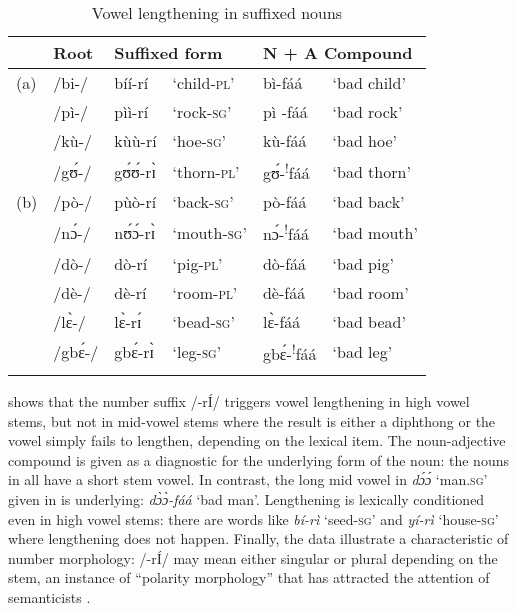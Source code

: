 \documentclass[output=paper,newtxmath,modfonts,nonflat,draftmode]{langsci/langscibook}
\begin{document}
\begin{table}
\begin{tabularx}{\textwidth}{lXlXlX}
\lsptoprule
& {Root} & \multicolumn{2}{l}{{Suffixed form}} & \multicolumn{2}{l}{{N + A Compound}} \\
\midrule
(a) & /bi-/ & bíí-rí & ‘child-\textsc{pl’} & bì-fáá & ‘bad child’\\
& /pì-/ & pìì-rí & ‘rock-\textsc{sg’} & pì -fáá & ‘bad rock’\\
& /kù-/ & kùù-rí & ‘hoe-\textsc{sg}’ & kù-fáá & ‘bad hoe’\\
& /gʊ́-/ & gʊ́ʊ́-rɪ̀ & ‘thorn-\textsc{pl’} & gʊ́-\textsuperscript{!}fáá & ‘bad thorn’\\
\tablevspace
(b) & /pò-/ & pùò-rí & ‘back-\textsc{sg}’ & pò-fáá & ‘bad back’\\
& /nɔ́-/ & nʊ́ɔ́-rɪ̀ & ‘mouth-\textsc{sg}’ & nɔ́-\textsuperscript{!}fáá & ‘bad mouth’\\
& /dò-/ & dò-rí & ‘pig-\textsc{pl}’ & dò-fáá & ‘bad pig’\\
& /dè-/ & dè-rí & ‘room-\textsc{pl}’ & dè-fáá & ‘bad room’\\
& /lɛ̀-/ & lɛ̀-rɪ́ & ‘bead-\textsc{sg}’ & lɛ̀-fáá & ‘bad bead’\\
& /gbɛ́-/ & gbɛ́-rɪ̀ & ‘leg-\textsc{sg}’ & gbɛ́-\textsuperscript{!}fáá & ‘bad leg’\\
\lspbottomrule
\end{tabularx}
\caption{Vowel lengthening in suffixed nouns}
\label{tab:anttila:3} 
\end{table}


\break
{ shows that the number suffix /-rÍ/ triggers vowel}{ lengthening} {i}{n high vowel stems}{, but not in mid-vowel stems where the result is either a diphthong or the vowel simply fails to lengthen, depending on the lexical item. The noun-adjective compound is given as a diagnostic for the underlying form of the noun: the nouns in  all have a short stem vowel. In contrast, the} {long mid vowel} {in} {\textit{dɔ́ɔ́}}{ ‘man.}{\textsc{sg}}{’ given in  is underlying:} {\textit{dɔ̀ɔ̀-}}{\textit{fáá}}{ ‘bad man’.} {Lengthening is lexically conditioned even in high vowel stems: there are words like} {\textit{bí-rì}}{ ‘seed-}{\textsc{sg’}}{ and} {\textit{yí-rì}}{ ‘house-}{\textsc{sg}}{’ where lengthening does not happen. Finally,} {the data illustrate a characteristic}{  of  number morphology: /-r}{Í}{/ may mean either singular or plural depending on the stem, an instance of “polarity morphology” that has attracted the attention of semanticists \citep{Grimm2012}.} 
\end{document}
